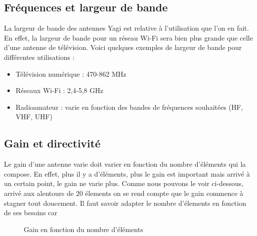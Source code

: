 \documentclass[12pt, a4paper]{article}
\begin{document}
\subsection{Fréquences et largeur de bande}
La largeur de bande des antennes Yagi est relative 
à l'utilisation que l'on en fait. En effet, la largeur 
de bande pour un réseau Wi-Fi sera bien plus grande
que celle d'une antenne de télévision. Voici quelques 
exemples de largeur de bande pour différentes 
utilisations :\\
\begin{itemize}
    \item Télévision numérique : 470-862 MHz 
    \item Réseaux Wi-Fi : 2,4-5,8 GHz
    \item Radioamateur : varie en fonction des bandes de fréquences souhaitées (HF, VHF, UHF)
\end{itemize}

\newpage
\subsection{Gain et directivité}
Le gain d'une antenne varie doit varier en fonction 
du nombre d'éléments qui la compose. En effet, plus
il y a d'éléments, plus le gain est important mais arrivé
à un certain point, le gain ne varie plus. Comme nous 
pouvons le voir ci-dessous, arrivé aux alentours 
de 20 élements on se rend compte que le gain commence
à stagner tout doucement. Il faut savoir adapter le nombre 
d'élements en fonction de ses besoins car \\ 


\begin{figure}
    \centering
    \caption{Gain en fonction du nombre d'éléments \cite{r2}}
\end{figure}
\end{document}

